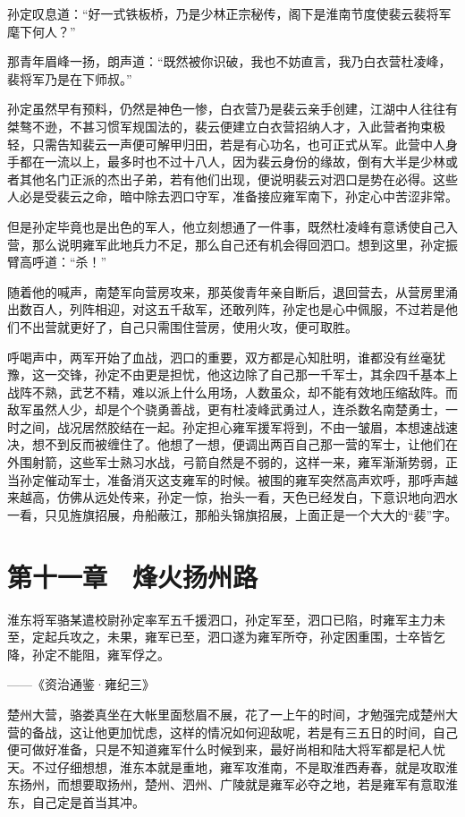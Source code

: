 孙定叹息道：“好一式铁板桥，乃是少林正宗秘传，阁下是淮南节度使裴云裴将军麾下何人？”

那青年眉峰一扬，朗声道：“既然被你识破，我也不妨直言，我乃白衣营杜凌峰，裴将军乃是在下师叔。”

孙定虽然早有预料，仍然是神色一惨，白衣营乃是裴云亲手创建，江湖中人往往有桀骜不逊，不甚习惯军规国法的，裴云便建立白衣营招纳人才，入此营者拘束极轻，只需告知裴云一声便可解甲归田，若是有心功名，也可正式从军。此营中人身手都在一流以上，最多时也不过十八人，因为裴云身份的缘故，倒有大半是少林或者其他名门正派的杰出子弟，若有他们出现，便说明裴云对泗口是势在必得。这些人必是受裴云之命，暗中除去泗口守军，准备接应雍军南下，孙定心中苦涩非常。

但是孙定毕竟也是出色的军人，他立刻想通了一件事，既然杜凌峰有意诱使自己入营，那么说明雍军此地兵力不足，那么自己还有机会得回泗口。想到这里，孙定振臂高呼道：“杀！”

随着他的喊声，南楚军向营房攻来，那英俊青年亲自断后，退回营去，从营房里涌出数百人，列阵相迎，对这五千敌军，还敢列阵，孙定也是心中佩服，不过若是他们不出营就更好了，自己只需围住营房，使用火攻，便可取胜。

呼喝声中，两军开始了血战，泗口的重要，双方都是心知肚明，谁都没有丝毫犹豫，这一交锋，孙定不由更是担忧，他这边除了自己那一千军士，其余四千基本上战阵不熟，武艺不精，难以派上什么用场，人数虽众，却不能有效地压缩敌阵。而敌军虽然人少，却是个个骁勇善战，更有杜凌峰武勇过人，连杀数名南楚勇士，一时之间，战况居然胶结在一起。孙定担心雍军援军将到，不由一皱眉，本想速战速决，想不到反而被缠住了。他想了一想，便调出两百自己那一营的军士，让他们在外围射箭，这些军士熟习水战，弓箭自然是不弱的，这样一来，雍军渐渐势弱，正当孙定催动军士，准备消灭这支雍军的时候。被围的雍军突然高声欢呼，那呼声越来越高，仿佛从远处传来，孙定一惊，抬头一看，天色已经发白，下意识地向泗水一看，只见旌旗招展，舟船蔽江，那船头锦旗招展，上面正是一个大大的“裴”字。

\chapter{第十一章　烽火扬州路}

淮东将军骆某遣校尉孙定率军五千援泗口，孙定军至，泗口已陷，时雍军主力未至，定起兵攻之，未果，雍军已至，泗口遂为雍军所夺，孙定困重围，士卒皆乞降，孙定不能阻，雍军俘之。

——《资治通鉴·雍纪三》

楚州大营，骆娄真坐在大帐里面愁眉不展，花了一上午的时间，才勉强完成楚州大营的备战，这让他更加忧虑，这样的情况如何迎敌呢，若是有三五日的时间，自己便可做好准备，只是不知道雍军什么时候到来，最好尚相和陆大将军都是杞人忧天。不过仔细想想，淮东本就是重地，雍军攻淮南，不是取淮西寿春，就是攻取淮东扬州，而想要取扬州，楚州、泗州、广陵就是雍军必夺之地，若是雍军有意取淮东，自己定是首当其冲。

